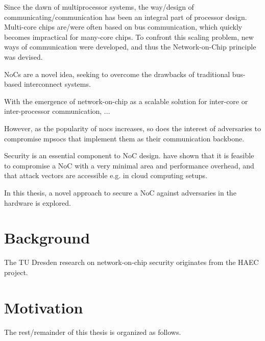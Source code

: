 Since the dawn of multiprocessor systems, the way/design of communicating/communication has been an integral part of processor design.
Multi-core chips are/were often based on bus communication, which quickly becomes impractical for many-core chips.
To confront this scaling problem, new ways of communication were developed, and thus the Network-on-Chip principle was devised.

NoCs are a novel idea, seeking to overcome the drawbacks of traditional bus-based interconnect systems.

With the emergence of network-on-chip as a scalable solution for inter-core or inter-processor communication, ...

However, as the popularity of \glspl{noc} increases, so does the interest of adversaries to compromise \glspl{mpsoc} that implement them as their communication
backbone.

Security is an essential component to NoC design. \citeauthor{ancajas14fortnocs} have shown that it is feasible to compromise a NoC with a very
minimal area and performance overhead, and that attack vectors are accessible e.g. in cloud computing setups. \cite{ancajas14fortnocs}

In this thesis, a novel approach to secure a NoC against adversaries in the hardware is explored.

\section{Background}\label{sec:background}
The TU Dresden research on network-on-chip security originates from the HAEC project.

\section{Motivation}\label{sec:motivation}

The rest/remainder of this thesis is organized as follows.
